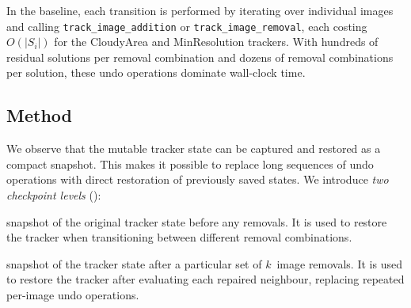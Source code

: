 \documentclass[11pt,a4paper]{article}
\begin{document}
In the baseline, each transition is performed by iterating over
individual images and calling \texttt{track\_image\_addition} or
\texttt{track\_image\_removal}, each costing $O(|S_i|)$ for the
CloudyArea and MinResolution trackers.  With hundreds of residual
solutions per removal combination and dozens of removal combinations per
solution, these undo operations dominate wall-clock time.

\subsection{Method}

We observe that the mutable tracker state can be captured and restored
as a compact snapshot.  This makes it possible to replace long sequences
of undo operations with direct restoration of previously saved states.
We introduce \emph{two checkpoint levels} ():

\begin{description}[nosep,leftmargin=1.5em]
  \item[Base checkpoint:] snapshot of the original tracker state before
    any removals.  It is used to restore the tracker when transitioning
    between different removal combinations.
  \item[Removed-state checkpoint:] snapshot of the tracker state after a
    particular set of $k$~image removals.  It is used to restore the
    tracker after evaluating each repaired neighbour, replacing repeated
    per-image undo operations.
\end{description}
\end{document}

